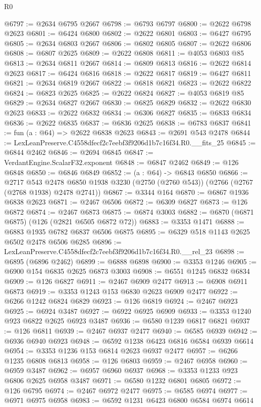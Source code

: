 \begin{lexlean}{R0}
\begin{coremodule}
@6797 := @2634 @6795 @2667
@6798 := @6793 @6797
@6800 := @2622 @6798 @2623
@6801 := @6424 @6800
@6802 := @2622 @6801
@6803 := @6427 @6795
@6805 := @2634 @6803 @2667
@6806 := @6802 @6805
@6807 := @2622 @6806
@6808 := @6807 @2625
@6809 := @2622 @6808
@6811 := @4053 @6803 @85
@6813 := @2634 @6811 @2667
@6814 := @6809 @6813
@6816 := @2622 @6814 @2623
@6817 := @6424 @6816
@6818 := @2622 @6817
@6819 := @6427 @6811
@6821 := @2634 @6819 @2667
@6822 := @6818 @6821
@6823 := @2622 @6822
@6824 := @6823 @2625
@6825 := @2622 @6824
@6827 := @4053 @6819 @85
@6829 := @2634 @6827 @2667
@6830 := @6825 @6829
@6832 := @2622 @6830 @2623
@6833 := @2622 @6832
@6834 := @6306 @6827
@6835 := @6833 @6834
@6836 := @2622 @6835
@6837 := @6836 @2625
@6838 := @6783 @6837
@6841 := fun (a : @64) => @2622 @6838 @2623
@6843 := @2691 @543 @2478
@6844 := LexLeanPreserve.C4558dfecf2c7eebf3f9206d1b7c16f34.R0.__fits_25
@6845 := @6844 @2462
@6846 := @2694 @6845
@6847 := VerdantEngine.ScalarF32.exponent
@6848 := @6847 @2462
@6849 := @126 @6848
@6850 := @6846 @6849
@6852 := (a : @64) -> @6843 @6850
@6866 := @2717
    @543
    @2478
    @6850
    @1938
    @3230
    (@2750 (@2760 @543))
    (@2766 (@2767 (@2768 @1938) @2478 @2741))
@6867 := @3344 @164
@6870 := @6867 @1936 @6838 @2623
@6871 := @2467 @6506
@6872 := @6309 @6827
@6873 := @126 @6872
@6874 := @2467 @6873
@6875 := @6874 @3003
@6882 := @6870 (@6871 @6875) (@126 (@2821 @6505 @6872 @72))
@6883 := @3353 @1471
@6888 := @6883 @1935 @6782 @6837 @6506 @6875
@6895 := @6329 @518 @1143 @2625 @6502 @2478 @6506 @6285
@6896 := LexLeanPreserve.C4558dfecf2c7eebf3f9206d1b7c16f34.R0.__rel_23
@6898 := @6895 (@6896 @2462)
@6899 := @6888 @6898
@6900 := @3353 @1246
@6905 := @6900 @154 @6835 @2625 @6873 @3003
@6908 := @6551 @1245 @6832 @6834
@6909 := @126 @6827
@6911 := @2467 @6909 @2477
@6913 := @6908 @6911 @6873
@6919 := @3353 @1243 @153 @6830 @2623 @6909 @2477
@6922 := @6266 @1242 @6824 @6829
@6923 := @126 @6819
@6924 := @2467 @6923
@6925 := @6924 @3487
@6927 := @6922 @6925 @6909
@6933 := @3353 @1240 @923 @6822 @2625 @6923 @3487
@6936 := @6580 @1239 @6817 @6821
@6937 := @126 @6811
@6939 := @2467 @6937 @2477
@6940 := @6585 @6939
@6942 := @6936 @6940 @6923
@6948 := @6592 @1238 @6423 @6816 @6584 @6939 @6614
@6954 := @3353 @1236 @153 @6814 @2623 @6937 @2477
@6957 := @6266 @1235 @6808 @6813
@6958 := @126 @6803
@6959 := @2467 @6958
@6960 := @6959 @3487
@6962 := @6957 @6960 @6937
@6968 := @3353 @1233 @923 @6806 @2625 @6958 @3487
@6971 := @6580 @1232 @6801 @6805
@6972 := @126 @6795
@6974 := @2467 @6972 @2477
@6975 := @6585 @6974
@6977 := @6971 @6975 @6958
@6983 := @6592 @1231 @6423 @6800 @6584 @6974 @6614

\end{coremodule}
\end{lexlean}
